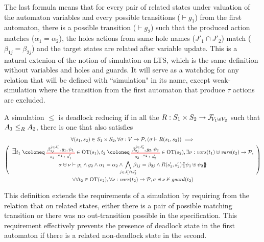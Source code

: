 \documentclass{article}
\begin{document}
The last formula means that for every pair of related states under valuation of the automaton variables and every possible transitions (\(\vdash g_1\)) from the first automaton, there is a possible transition (\(\vdash g_2\)) such that the produced action matches (\(\alpha_1 = \alpha_2\)), the holes actions from same hole names (\(J'_1 \cap J'_2\)) match (\(\beta_{1j} = \beta_{2j}\)) and the target states are related after variable update.
This is a natural extenion of the notion of simulation on LTS, which is the same definition without variables and holes and guards.
It will serve as a watchdog for any relation that will be defined with ``simulation" in its name, except weak-simulation where the transition from the first automaton that produce \(\tau\) actions are excluded.

\begin{defi}
A simulation \(\leq\) is deadlock reducing if in all the \(R: S_1 \times S_2 \to \rformulae[V_1 \uplus V_2]\) such that \(\wrel{A_1}{A_2}{R}\), there is one that also satisfies
\begin{multline*}
	\forall \mpar{s_1, s_2} \in S_1 \times S_2, \forall \sigma: V \to \values, \mpar{\sigma \vdash R\mpar{s_1, s_2}} \implies \\
	\mpar{\everymath{\displaystyle}\begin{array}{c}
		\bigsymb{\exists} t_1 \defobject \OTx{1}{}{1}{1} \in \fOT{s_1}, t_2 \defobject \OTx{2}{}{2}{2} \in \fOT{s_2}, \exists \nu: \fvars{t_1} \uplus \fvars{t_2} \to \values, \\
		\sigma \uplus \nu \vdash g_1 \wedge g_2 \wedge \alpha_1 = \alpha_2 \wedge \bigwedge_\subbox{j \in J'_1 \cap J'_2} \beta_{1j} = \beta_{2j} \wedge R\mpar{s'_1, s'_2}\psubst{\psi_1 \uplus \psi_2}
	\end{array}} \\
	\vee \forall t_2 \in \fOT{s_2}, \forall \nu: \fvars{t_2} \to \values, \sigma \uplus \nu \nvdash \fguard{t_2}
\end{multline*}
\end{defi}
This definition extends the requirements of a simulation by requiring from the relation that on related states, either there is a pair of possible matching transition or there was no out-transition possible in the specification.
This requirement effectively prevents the presence of deadlock state in the first automaton if there is a related non-deadlock state in the second.

\end{document}
